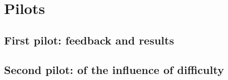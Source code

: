 \chapter{Pilots}
\section{First pilot: feedback and results}
\section{Second pilot: of the influence of difficulty}